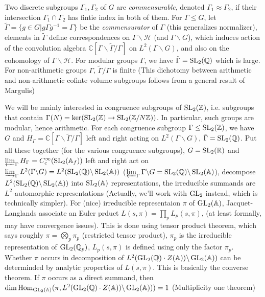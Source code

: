 \documentclass[main]{subfiles}
\begin{document}
\begin{definition}
Two discrete subgroups $\Gamma_1,\Gamma_2$ of $G$ are \textit{commensurable}, denoted $\Gamma_1\approx\Gamma_2$, if their intersection $\Gamma_1\cap\Gamma_2$ has fintie index in both of them. For $\Gamma\leq G$, let $\tilde\Gamma=\{g\in G|g\Gamma g^{-1}=\Gamma\}$ be the \textit{commensurator} of $\Gamma$ (this generalizes normalizer), elements in $\tilde\Gamma$ define correspondences on $\Gamma\backslash \mathcal H$ (and $\Gamma\backslash G$), which induces action of the convolution algebra $\mathbb C[\Gamma\backslash\tilde\Gamma/\Gamma]$ on $L^2(\Gamma\backslash G)$, and also on the cohomology of $\Gamma\backslash \mathcal H$. For modular groups $\Gamma$, we have $\tilde\Gamma=\operatorname{SL}_2(\mathbb Q)$ which is large. For non-arithmetic groups $\Gamma$, $\tilde\Gamma/\Gamma$ is finite (This dichotomy between arithmetic and non-arithmetic cofinte volume subgroups follows from a general result of Margulis)
\end{definition}

\begin{remark}
We will be mainly interested in congruence subgroups of $\operatorname{SL}_2(\mathbb Z)$, i.e. subgroups that contain $\Gamma(N)=\ker(\operatorname{SL}_2(\mathbb Z)\to\operatorname{SL}_2(\mathbb Z/N\mathbb Z))$. In particular, such groups are modular, hence arithmetic. For each congruence subgroup $\Gamma\leq\operatorname{SL}_2(\mathbb Z)$, we have $G$ and $H_\Gamma=\mathbb C[\Gamma\backslash\tilde\Gamma/\Gamma]$ left and right acting on $L^2(\Gamma\backslash G)$, $\tilde\Gamma=\operatorname{SL}_2(\mathbb Q)$. Put all these together (for the various congruence subgroups), $G=\operatorname{SL}_2(\mathbb R)$ and $\varprojlim_\Gamma H_\Gamma=C^\infty_c(\operatorname{SL}_2(\mathbb A_f))$ left and right act on $\varinjlim_\Gamma L^2(\Gamma\backslash G)=L^2(\operatorname{SL}_2(\mathbb Q)\backslash\operatorname{SL}_2(\mathbb A))$ ($\varprojlim_\Gamma\Gamma\backslash G=\operatorname{SL}_2(\mathbb Q)\backslash\operatorname{SL}_2(\mathbb A)$), decompose $L^2(\operatorname{SL}_2(\mathbb Q)\backslash\operatorname{SL}_2(\mathbb A))$ into $\operatorname{SL}_2(\mathbb A)$ representations, the irreducible summands are $L^2$-automorphic representations (Actually, we'll work with $\operatorname{GL}_2$ instead, which is technically simpler). For (nice) irreducible representaion $\pi$ of $\operatorname{GL}_2(\mathbb A)$, Jacquet-Langlands associate an Euler prduct $L(s,\pi)=\prod_pL_p(s,\pi)$, (at least formally, may have convergence issues). This is done using tensor product theorem, which says roughly $\pi=\bigotimes_p\pi_p$ (restricted tensor product), $\pi_p$ is the irreducible representation of $\operatorname{GL}_2(\mathbb Q_p)$, $L_p(s,\pi)$ is defined using only the factor $\pi_p$. Whether $\pi$ occurs in decomposition of $L^2(\operatorname{GL}_2(\mathbb Q)\cdot Z(\mathbb A))\backslash\operatorname{GL}_2(\mathbb A))$ can be determinded by analytic properties of $L(s,\pi)$. This is basically the converse theorem. If $\pi$ occurs as a direct summand, then $\dim\operatorname{Hom}_{\operatorname{GL}_2(\mathbb A)}(\pi,L^2(\operatorname{GL}_2(\mathbb Q)\cdot Z(\mathbb A))\backslash\operatorname{GL}_2(\mathbb A)))=1$ (Multiplicity one theorem)
\end{remark}
\end{document}
